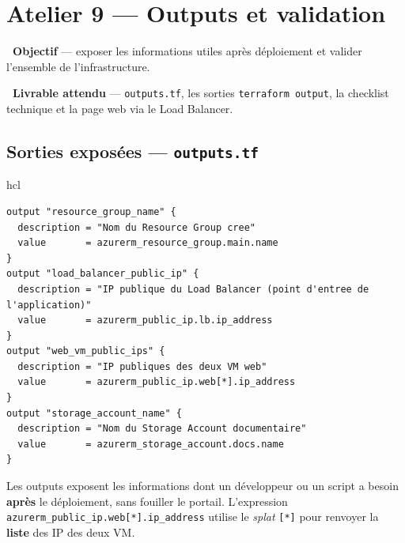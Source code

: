 \documentclass[11pt,a4paper]{article}
\newcommand{\emo}[1]{\raisebox{-0.14em}{\twemoji{#1}}}
\newcommand{\eTarget}{\emo{1f3af}}
\newcommand{\ePackage}{\emo{1f4e6}}
\newcommand{\code}[1]{\texttt{#1}}
\begin{document}
\section{Atelier 9 — Outputs et validation}

\begin{fiche}
\textbf{\eTarget~Objectif} — exposer les informations utiles après déploiement et valider l'ensemble de l'infrastructure.

\textbf{\ePackage~Livrable attendu} — \code{outputs.tf}, les sorties \code{terraform output}, la checklist technique et la page web via le Load Balancer.
\end{fiche}

\subsection{Sorties exposées — \code{outputs.tf}}
\begin{codebox}{hcl}
\begin{Verbatim}
output "resource_group_name" {
  description = "Nom du Resource Group cree"
  value       = azurerm_resource_group.main.name
}
output "load_balancer_public_ip" {
  description = "IP publique du Load Balancer (point d'entree de l'application)"
  value       = azurerm_public_ip.lb.ip_address
}
output "web_vm_public_ips" {
  description = "IP publiques des deux VM web"
  value       = azurerm_public_ip.web[*].ip_address
}
output "storage_account_name" {
  description = "Nom du Storage Account documentaire"
  value       = azurerm_storage_account.docs.name
}
\end{Verbatim}
\end{codebox}
Les outputs exposent les informations dont un développeur ou un script a besoin \textbf{après} le déploiement,
sans fouiller le portail. L'expression \code{azurerm\_public\_ip.web[*].ip\_address} utilise le \textit{splat}
\code{[*]} pour renvoyer la \textbf{liste} des IP des deux VM.
\end{document}
